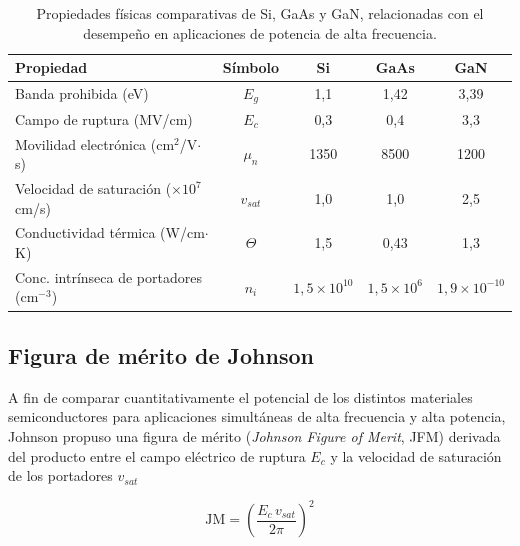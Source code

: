 \begin{table}[H]
    \centering
    \caption{Propiedades físicas comparativas de Si, GaAs y GaN, relacionadas con el desempeño en aplicaciones de potencia de alta frecuencia.}
    \label{tab:material_comparison}
    \begin{tabular}{lcccc}
        \hline\hline
        \textbf{Propiedad}                                 & \textbf{Símbolo} & \textbf{Si} & \textbf{GaAs} & \textbf{GaN} \\
        \hline
        Banda prohibida (eV)                               & $E_g$            & 1,1       & 1,42        & 3,39       \\
        Campo de ruptura (MV/cm)                           & $E_c$            & 0,3       & 0,4         & 3,3        \\
        Movilidad electrónica (cm$^{2}$/V$\cdot$s)         & $\mu_n$          & 1350      & 8500        & 1200       \\
        Velocidad de saturación ($\times 10^7$ cm/s)       & $v_{sat}$        & 1,0       & 1,0         & 2,5        \\
        Conductividad térmica (W/cm$\cdot$K)               & $\Theta$         & 1,5       & 0,43        & 1,3        \\
        Conc. intrínseca de portadores (cm$^{-3}$) & $n_i$ & $1{,}5\times10^{10}$ & $1{,}5\times10^{6}$ & $1{,}9\times10^{-10}$ \\ 
        \hline\hline
    \end{tabular}
\end{table}

\subsection{Figura de mérito de Johnson}
A fin de comparar cuantitativamente el potencial de los distintos materiales semiconductores para aplicaciones simultáneas de alta frecuencia y alta potencia, Johnson propuso una figura de mérito (\textit{Johnson Figure of Merit}, JFM) derivada del producto entre el campo eléctrico de ruptura $E_c$ y la velocidad de saturación de los portadores $v_{sat}$ \cite{johnson1965}

\begin{equation}
    \mathrm{JM} = \left( \frac{E_c \, v_{sat}}{2\pi} \right)^2
    \label{eq:jfm}
\end{equation}


